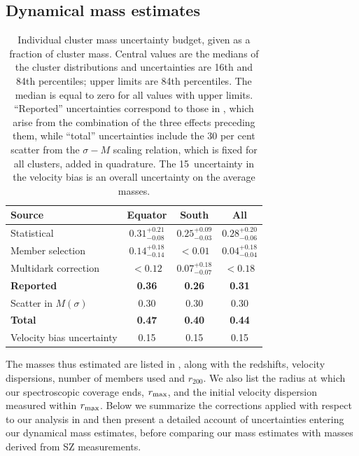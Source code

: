 \subsection{Dynamical mass estimates}
\label{s:mdyn}

\begin{table}\footnotesize
\centering
\caption{Individual cluster mass uncertainty budget, given as a fraction of cluster mass. Central 
values are the medians of the cluster distributions and uncertainties are 16th and 84th 
percentiles; upper limits are 84th percentiles. The median is equal to zero for all values with 
upper limits. ``Reported'' uncertainties correspond to those in , which arise from the combination of the three effects preceding them, while ``total'' uncertainties include the 30 per cent scatter from the $\sigma-M$ scaling relation, which is fixed for all clusters, added in quadrature. The 15\percent\ uncertainty in the velocity bias is an overall uncertainty on the average masses.}
\label{t:uncertainties}
\begin{tabular}{l c c c}
\hline\hline
 Source & Equator & South & All \\[0.5ex]
\hline
 Statistical & $0.31_{-0.08}^{+0.21}$ & $0.25_{-0.03}^{+0.09}$ & $0.28_{-0.06}^{+0.20}$ \\[0.3ex]
 Member selection & $0.14_{-0.14}^{+0.18}$ & $<0.01$ & $0.04_{-0.04}^{+0.18}$ \\[0.3ex]
 Multidark correction & $<0.12$ & $0.07_{-0.07}^{+0.18}$ & $<0.18$ \\[0.2ex]
 \hline
 {\bf Reported} & {\bf 0.36} & {\bf 0.26} & {\bf 0.31} \\[0.2ex]
\hline
 Scatter in $M(\sigma)$ & 0.30 & 0.30 & 0.30 \\[0.2ex]
\hline
 {\bf Total} & {\bf 0.47} & {\bf 0.40} & {\bf 0.44} \\[0.2ex]
\hline
 Velocity bias uncertainty & 0.15 & 0.15 & 0.15 \\[0.2ex]
\hline
\end{tabular}
\end{table}

The masses thus estimated are listed in , along with the redshifts, velocity 
dispersions, number of members used and $r_{200}$. We also list the radius at which our 
spectroscopic coverage ends, $r_{\rm max}$, and the initial velocity dispersion measured within 
$r_{\rm max}$. Below we summarize the corrections applied with respect to our analysis in 
\cite{sifon13} and then present a detailed account of uncertainties entering our dynamical mass 
estimates, before comparing our mass estimates with masses derived from SZ measurements.


